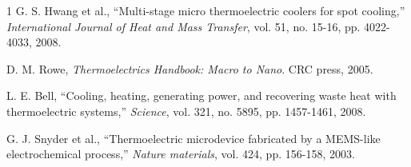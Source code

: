 \documentclass[conference,a4paper]{IEEEtran}
\begin{document}
\begin{thebibliography}{1}
G. S. Hwang et al., ``Multi-stage micro thermoelectric coolers for spot cooling,'' \textit{International Journal of Heat and Mass Transfer}, vol. 51, no. 15-16, pp. 4022-4033, 2008.

D. M. Rowe, \textit{Thermoelectrics Handbook: Macro to Nano}. CRC press, 2005.

L. E. Bell, ``Cooling, heating, generating power, and recovering waste heat with thermoelectric systems,'' \textit{Science}, vol. 321, no. 5895, pp. 1457-1461, 2008.

G. J. Snyder et al., ``Thermoelectric microdevice fabricated by a MEMS-like electrochemical process,'' \textit{Nature materials}, vol. 424, pp. 156-158, 2003.
\end{thebibliography}
\end{document}
